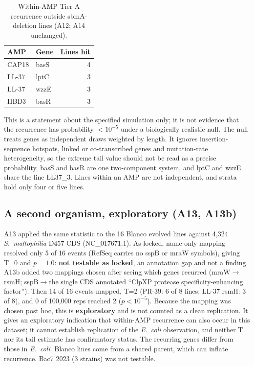 \documentclass[11pt,letterpaper]{article}
\newcommand{\toprule}{\hline}\newcommand{\midrule}{\hline}\newcommand{\bottomrule}{\hline}
\begin{document}
\begin{table}[h]\centering\small\caption{Within-AMP Tier A recurrence outside sbmA-deletion lines (A12; A14 unchanged).}\label{tab:a12}
\begin{tabular}{llr}\toprule AMP & Gene & Lines hit\\\midrule CAP18 & basS & 4\\ LL-37 & lptC & 3\\ LL-37 & wzzE & 3\\ HBD3 & basR & 3\\\bottomrule\end{tabular}\end{table}

This is a statement about the specified simulation only; it is not evidence that the recurrence has probability $<10^{-5}$ under a biologically realistic null. The null treats genes as independent draws weighted by length. It ignores insertion-sequence hotspots, linked or co-transcribed genes and mutation-rate heterogeneity, so the extreme tail value should not be read as a precise probability. basS and basR are one two-component system, and lptC and wzzE share the line LL37\_3. Lines within an AMP are not independent, and strata hold only four or five lines.

\subsection{A second organism, exploratory (A13, A13b)}
A13 applied the same statistic to the 16 Blanco evolved lines against 4{,}324 \textit{S.\ maltophilia} D457 CDS (NC\_017671.1). As locked, name-only mapping resolved only 5 of 16 events (RefSeq carries no sspB or mraW symbols), giving T=0 and $p=1.0$: \textbf{not testable as locked}, an annotation gap and not a finding. A13b added two mappings chosen after seeing which genes recurred (mraW$\to$rsmH; sspB$\to$the single CDS annotated ``ClpXP protease specificity-enhancing factor''). Then 14 of 16 events mapped, T=2 (PR-39: 6 of 8 lines; LL-37 rsmH: 3 of 8), and 0 of 100{,}000 reps reached 2 ($p<10^{-5}$). Because the mapping was chosen post hoc, this is \textbf{exploratory} and is not counted as a clean replication. It gives an exploratory indication that within-AMP recurrence can also occur in this dataset; it cannot establish replication of the \textit{E.\ coli} observation, and neither T nor its tail estimate has confirmatory status. The recurring genes differ from those in \textit{E.\ coli}. Blanco lines come from a shared parent, which can inflate recurrence. Bac7 2023 (3 strains) was not testable.
\end{document}
